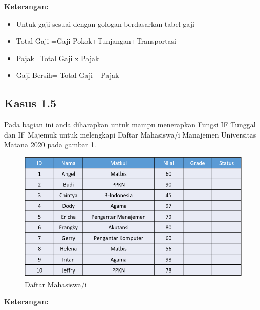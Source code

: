 \documentclass[
]{book}
\providecommand{\tightlist}{%
  \setlength{\itemsep}{0pt}\setlength{\parskip}{0pt}}
\begin{document}
\textbf{Keterangan:}

\begin{itemize}
\tightlist
\item
  Untuk gaji sesuai dengan gologan berdasarkan tabel gaji
\item
  Total Gaji =Gaji Pokok+Tunjangan+Transportasi
\item
  Pajak=Total Gaji x Pajak
\item
  Gaji Bersih= Total Gaji -- Pajak
\end{itemize}

\hypertarget{kasus-1.5}{%
\subsection*{Kasus 1.5}\label{kasus-1.5}}

Pada bagian ini anda diharapkan untuk mampu menerapkan Fungsi IF Tunggal dan IF Majemuk untuk melengkapi Daftar Mahasiswa/i Manajemen Universitas Matana 2020 pada gambar \ref{fig:tabel5}.

\begin{figure}

{\centering \includegraphics[width=1\linewidth]{images/tabel5} 

}

\caption{Daftar Mahasiswa/i}\label{fig:tabel5}
\end{figure}

\textbf{Keterangan:}
\end{document}
